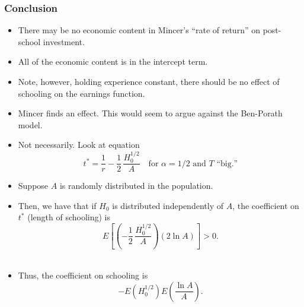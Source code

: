 \documentclass[12pt,compress,handout]{beamer}  %
\begin{document}
\begin{frame}
\frametitle{\textbf{Conclusion}}

\small
\begin{itemize}
\item
There may be no economic content in Mincer's ``rate of
return'' on post-school investment.\\[5mm]

\item
All of the economic content is in the intercept term.\\[5mm]

\item
Note, however, holding experience constant, there should be no effect of
schooling on the earnings function.\\[5mm]

\item Mincer finds an effect. This would seem to argue against the Ben-Porath
model.\\[5mm]

\item
Not necessarily. Look at equation
\begin{equation*}
    t^{*} = \frac{1}{r} - \frac{1}{2}\,\frac{H^{1/2}_{0}}{A}
    \quad\text{for }\alpha = 1/2 \text{ and } T \text{ ``big.''}
\end{equation*}
\end{itemize}

\end{frame}


\begin{frame}
\begin{itemize}
\item Suppose $A$ is randomly distributed in the population.\\[5mm]
\item Then, we have that if $H_0$ is distributed independently of $A$, the coefficient on $t^{*}$ (length of schooling) is
\begin{equation*}
    E\left[
        \left( -\frac{1}{2}\,\frac{H^{1/2}_{0}}{A}\right)\left(2 \ln A\right)
    \right] > 0\text{.}
\end{equation*}\ \\[4mm]
\item Thus, the coefficient on schooling is
\begin{equation*}
    -E\left( H_{0}^{1/2}\right)E\left(\frac{\ln A}{A}\right) \text{.}
\end{equation*}
\end{itemize}
\end{frame}
\end{document}

